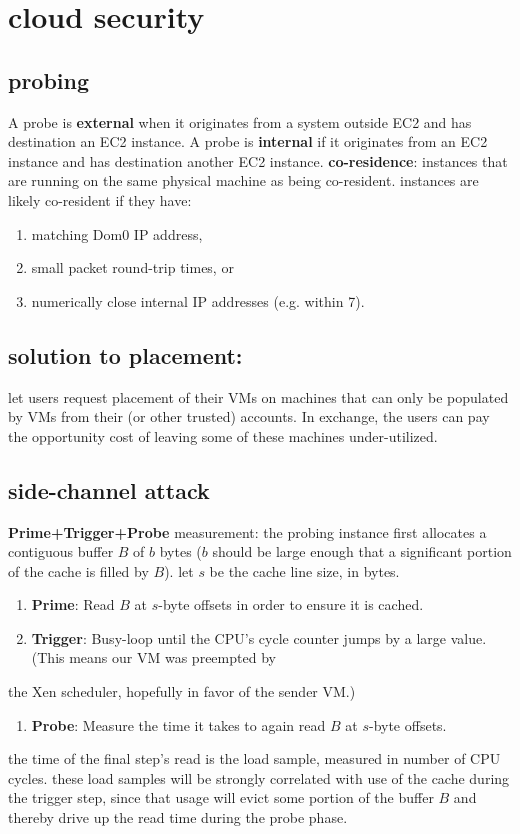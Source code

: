 \documentclass[9pt,conference]{IEEEtran}
\begin{document}
\section{cloud security}
\label{sec-12}
\subsection{probing}
\label{sec-12-1}
A probe is \textbf{external} when it originates from a system outside EC2 and has destination an EC2 instance.
A probe is \textbf{internal} if it originates from an EC2 instance and has destination another EC2 instance.
\textbf{co-residence}: instances that are running on the same physical machine as being co-resident.
instances are likely co-resident if they have:
\begin{enumerate}
\item matching Dom0 IP address,
\item small packet round-trip times, or
\item numerically close internal IP addresses (e.g. within 7).
\end{enumerate}

\subsection{solution to placement:}
\label{sec-12-2}
let users request placement of their VMs on machines that can only be populated by VMs from their (or other trusted) accounts. In exchange, the users can pay the opportunity cost of leaving some of these machines under-utilized.

\subsection{side-channel attack}
\label{sec-12-3}
\textbf{Prime+Trigger+Probe} measurement:
the probing instance first allocates a contiguous buffer $B$ of $b$ bytes
($b$ should be large enough that a significant portion of the cache is filled by $B$).
let $s$ be the cache line size, in bytes.
\begin{enumerate}
\item \textbf{Prime}: Read $B$ at $s$-byte offsets in order to ensure it is cached.
\item \textbf{Trigger}: Busy-loop until the CPU’s cycle counter jumps by a large value. (This means our VM was preempted by
\end{enumerate}
the Xen scheduler, hopefully in favor of the sender VM.)
\begin{enumerate}
\item \textbf{Probe}: Measure the time it takes to again read $B$ at $s$-byte offsets.
\end{enumerate}
the time of the final step’s read is the load sample,
measured in number of CPU cycles.
these load samples will be strongly correlated with use of the cache during
the trigger step, since that usage will evict some portion of the buffer $B$
and thereby drive up the read time during the probe phase.
\end{document}
